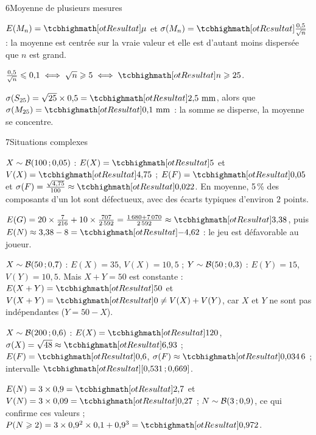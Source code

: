 \begin{corrige}{6}{Moyenne de plusieurs mesures}
\begin{questions}
  \item $E(M_n)=\res{\mu}$ et $\sigma(M_n)=\res{\frac{0{,}5}{\sqrt n}}$ : la moyenne est centrée sur la vraie valeur et elle est
    d'autant moins dispersée que $n$ est grand.
  \item $\frac{0{,}5}{\sqrt n}\leq0{,}1\iff\sqrt n\geq5\iff\res{n\geq25}$.
  \item $\sigma(S_{25})=\sqrt{25}\times0{,}5=\res{2{,}5\text{ mm}}$, alors que $\sigma(M_{25})=\res{0{,}1\text{ mm}}$ : la somme se disperse,
    la moyenne se concentre.
\end{questions}
\end{corrige}

\begin{corrige}{7}{Situations complexes}
\begin{questions}
  \item $X\sim\mathcal{B}(100\,{;}\,0{,}05)$ : $E(X)=\res{5}$ et $V(X)=\res{4{,}75}$ ; $E(F)=\res{0{,}05}$ et $\sigma(F)=\frac{\sqrt{4{,}75}}{100}\approx\res{0{,}022}$.
    En moyenne, 5\,\% des composants d'un lot sont défectueux, avec des écarts typiques d'environ $2$ points.
  \item $E(G)=20\times\frac{7}{216}+10\times\frac{707}{2\,592}=\frac{1\,680+7\,070}{2\,592}\approx\res{3{,}38}$, puis $E(N)\approx3{,}38-8=\res{-4{,}62}$ :
    le jeu est défavorable au joueur.
  \item $X\sim\mathcal{B}(50\,{;}\,0{,}7)$ : $E(X)=35$, $V(X)=10{,}5$ ; $Y\sim\mathcal{B}(50\,{;}\,0{,}3)$ : $E(Y)=15$, $V(Y)=10{,}5$. Mais $X+Y=50$ est
    constante : $E(X+Y)=\res{50}$ et $V(X+Y)=\res{0}\neq V(X)+V(Y)$, car $X$ et $Y$ ne sont pas indépendantes ($Y=50-X$).
  \item $X\sim\mathcal{B}(200\,{;}\,0{,}6)$ : $E(X)=\res{120}$, $\sigma(X)=\sqrt{48}\approx\res{6{,}93}$ ; $E(F)=\res{0{,}6}$, $\sigma(F)\approx\res{0{,}034\,6}$ ;
    intervalle $\res{\intFF{0{,}531}{0{,}669}}$.
  \item $E(N)=3\times0{,}9=\res{2{,}7}$ et $V(N)=3\times0{,}09=\res{0{,}27}$ ; $N\sim\mathcal{B}(3\,{;}\,0{,}9)$, ce qui confirme ces valeurs ;
    $P(N\geq2)=3\times0{,}9^{2}\times0{,}1+0{,}9^{3}=\res{0{,}972}$.
\end{questions}
\end{corrige}


